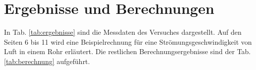 \newpage
\section{Ergebnisse und Berechnungen}
\label{sec:ergebnisse}

In Tab. \ref{tab:ergebnisse} sind die Messdaten des Versuches dargestellt. Auf den Seiten 6 bis 11 wird eine Beispielrechnung für eine Strömungsgeschwindigkeit von Luft in einem Rohr erläutert. Die restlichen Berechnungsergebnisse sind der Tab. \ref{tab:berechnung} aufgeführt.
\begin{table}[h!]
	\centering
	\renewcommand{\arraystretch}{1.2}
	\caption{gut gefälschte Volumenströme und Temperaturen der verschiedenen Rohre für Wasser und Luft}
\end{table}
